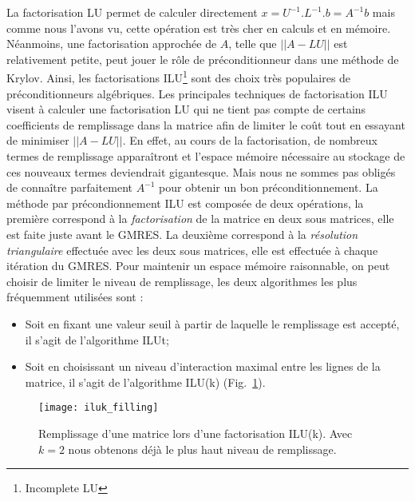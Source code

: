 La factorisation LU permet de calculer directement $x=U^{-1}.L^{-1}.b=A^{-1}b$ mais comme nous l'avons vu, cette opération est très cher en calculs et en mémoire.
%
Néanmoins, une factorisation approchée de $A$, telle que $||A-LU||$ est relativement petite, peut jouer le rôle de préconditionneur dans une méthode de Krylov.
%
Ainsi, les factorisations ILU\footnote{Incomplete LU}\cite{Saad96IMSLS} sont des choix très populaires de préconditionneurs algébriques.
%
Les principales techniques de factorisation ILU visent à calculer une factorisation LU qui ne tient pas compte de certains coefficients de remplissage dans la matrice afin de limiter le coût tout en essayant de minimiser $||A-LU||$.
%
En effet, au cours de la factorisation, de nombreux termes de remplissage apparaîtront et l'espace mémoire nécessaire au stockage de ces nouveaux termes deviendrait gigantesque.
%
Mais nous ne sommes pas obligés de connaître parfaitement $A^{-1}$ pour obtenir un bon préconditionnement.
%
La méthode par précondionnement ILU est composée de deux opérations, la première correspond à la {\em factorisation} de la matrice en deux sous matrices, elle est faite juste avant le GMRES.
%
La deuxième correspond à la {\em résolution triangulaire} effectuée avec les deux sous matrices, elle est effectuée à chaque itération du GMRES.
%
Pour maintenir un espace mémoire raisonnable, on peut choisir de limiter le niveau de remplissage, les deux algorithmes les plus fréquemment utilisées sont :
\begin{itemize}
  \item Soit en fixant une valeur seuil à partir de laquelle le remplissage est accepté, il s'agit de l'algorithme ILUt;
  \item Soit en choisissant un niveau d'interaction maximal entre les lignes de la matrice, il s'agit de l'algorithme ILU(k) (Fig.~\ref{fig:iluk_filling}).
\end{itemize}

\begin{figure}[!h]
  \centering
  \texttt{[image: iluk\_filling]}
  \caption{Remplissage d'une matrice lors d'une factorisation ILU(k). Avec $k=2$ nous obtenons déjà le plus haut niveau de remplissage.}
  \label{fig:iluk_filling}
\end{figure}

